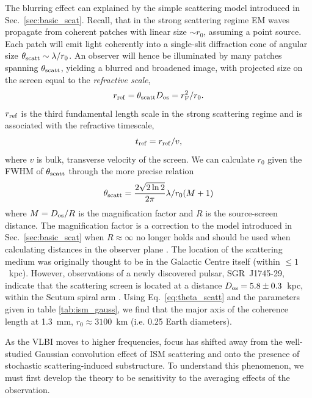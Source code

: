 The blurring effect can explained by the simple scattering model introduced in  Sec.~\ref{sec:basic_scat}. Recall, that in the strong scattering regime EM waves propagate from coherent patches with linear size $\sim r_0$, assuming a point source. Each patch will emit light coherently into a single-slit diffraction cone of angular size $\theta_{\rm scatt} \sim \lambda /r_0$. An observer will hence be illuminated by many patches spanning $\theta_{\rm scatt}$, yielding a blurred and broadened image, with projected size on the screen equal to the \emph{refractive scale},
\begin{equation}
r_{\rm ref} = \theta_{\rm scatt} D_{\rm os} = r_{\rm F}^2/r_0.
\end{equation}
$r_{\rm ref}$ is the third fundamental length scale in the strong scattering regime and is associated with the refractive timescale,
\begin{equation}
t_{\rm ref} = r_{\rm ref}/v,
\end{equation}
where $v$ is bulk, transverse velocity of the screen.
We can calculate $r_0$ given the FWHM of $\theta_{\rm scatt}$ through the more precise relation
\begin{equation}\label{eq:theta_scatt}
 \theta_{\rm scatt} = \frac{2\sqrt{2\ln{2}}}{2\pi} \lambda / r_0 (M+1)
\end{equation} 
where $M = D_{\rm os}/R$ is the magnification factor and $R$ is the source-screen distance. The magnification factor is a correction to the model introduced in Sec.~\ref{sec:basic_scat} when $R \approx \infty$ no longer holds and should be used when calculating distances in the observer plane \citep*{Goodman_1989}.
The location of the scattering medium was originally thought to be in the Galactic Centre itself (within $\le 1$~kpc). However, observations of a newly discovered pulsar, SGR~J1745-29, indicate that the scattering screen is located at a distance $D_{\rm os} = 5.8 \pm 0.3$~kpc, within the Scutum spiral arm \citep{Bower_2014}. Using Eq.~\ref{eq:theta_scatt} and the parameters given in table \ref{tab:ism_gauss}, we find that the major axis of the coherence length at 1.3~mm, $r_0 \approx 3100$~km (i.e. 0.25 Earth diameters).


As the VLBI moves to higher frequencies, focus has shifted away from the well-studied Gaussian convolution effect of ISM scattering and onto the presence of stochastic scattering-induced substructure. To understand this phenomenon, we must first develop the theory to be sensitivity to the averaging effects of the observation. 

